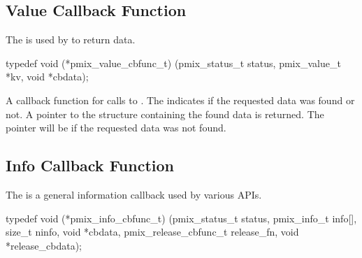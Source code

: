 \subsection{Value Callback Function}

\summary

The  is used by  to return data.

\cspecificstart
\begin{codepar}
typedef void (*pmix_value_cbfunc_t)
    (pmix_status_t status,
     pmix_value_t *kv, void *cbdata);
\end{codepar}
\cspecificend

\begin{arglist}
\end{arglist}


\descr

A callback function for calls to .
The  indicates if the requested data was found or not.
A pointer to the  structure containing the found data is returned.
The pointer will be  if the requested data was not found.


\subsection{Info Callback Function}

\summary

The  is a general information callback used by various APIs.

\cspecificstart
\begin{codepar}
typedef void (*pmix_info_cbfunc_t)
    (pmix_status_t status,
     pmix_info_t info[], size_t ninfo,
     void *cbdata,
     pmix_release_cbfunc_t release_fn,
     void *release_cbdata);
\end{codepar}
\cspecificend

\begin{arglist}
\end{arglist}


